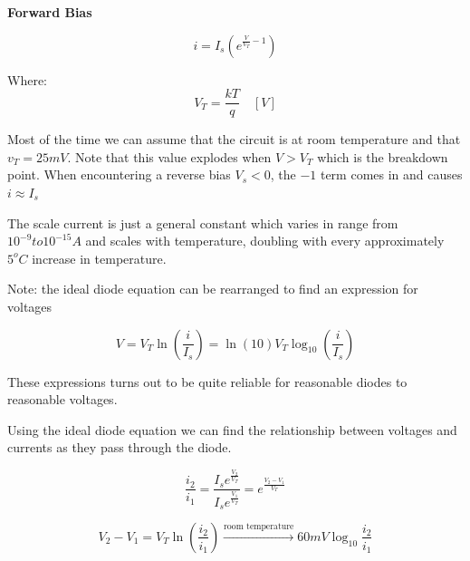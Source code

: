 \documentclass[../notes.tex]{subfiles}
\begin{document}
\begin{theorem}
	\textbf{Forward Bias} 

	\begin{equation}
		i = I_s(e^{\frac{V}{V_T} - 1})
		\label{eq:360:forward_bias}
	\end{equation}

	Where:
	\begin{equation}
		V_T = \frac{kT}{q} \quad [V]
	\end{equation}

	Most of the time we can assume that the circuit is at room temperature and that $ v_T = 25mV $.
	Note that this value explodes when $ V > V_T  $ which is the breakdown point.
	When encountering a reverse bias $ V_s < 0 $, the $ -1 $ term comes in and causes $ i \approx I_s  $  

	The scale current is just a general constant which varies in range from $ 10^{-9} to 10^{-15} A $ and scales with temperature, doubling with every approximately $ 5^o C $ increase in temperature.





	Note: the ideal diode equation can be rearranged to find an expression for voltages

	\begin{equation}
		V = V_T \ln{(\frac{i}{I_s}) = \ln{(10)} V_T \log_{10}{(\frac{i}{I_s})}}
		\label{eq:360:forward_bias_v}
	\end{equation}

	These expressions turns out to be quite reliable for reasonable diodes to reasonable voltages.

\end{theorem}

Using the ideal diode equation we can find the relationship between voltages and currents as they pass through the diode.


\begin{equation}
	\frac{i_2}{i_1} = \frac{I_s e^{\frac{V_2}{V_T}}}{I_s e^{\frac{V_1}{V_T}}} = e^{\frac{V_2 - V_1}{V_T}}
\end{equation}


\begin{equation}
	V_2 - V_1 = V_T \ln{(\frac{i_2}{i_1})} \xrightarrow{\text{room temperature}} 60mV \log_{10} \frac{i_2}{i_1}
\end{equation}
\end{document}

